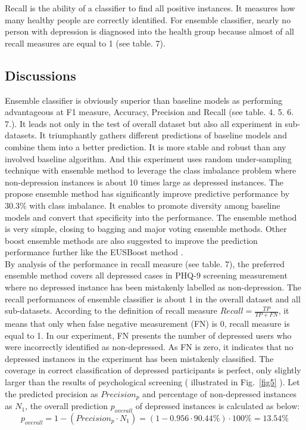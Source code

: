 \documentclass[12pt]{article}
\begin{document}
Recall is the ability of a classifier to find all positive instances. It measures how many healthy people are correctly identified. For ensemble classifier, nearly no person with depression is diagnosed into the health group because almost of all recall measures are equal to 1 (see table. 7).

\subsection{Discussions}
Ensemble classifier is obviously superior than baseline models as performing advantageous at F1 measure, Accuracy, Precision and Recall (see table. 4. 5. 6. 7.). It leads not only in the test of overall dataset but also all experiment in sub-datasets. It triumphantly gathers different predictions of baseline models and combine them into a better prediction. It is more stable and robust than any involved baseline algorithm. And this experiment uses random under-sampling technique with ensemble method to leverage the class imbalance problem where non-depression instances is about 10 times large as depressed instances. The propose ensemble method has significantly improve predictive performance by 30.3\% with class imbalance. It enables to promote diversity among baseline models and convert that specificity into the performance. The ensemble method is very simple, closing to bagging and major voting ensemble methods. Other boost ensemble methods are also suggested to improve the prediction performance further like the EUSBoost method \cite{Sagi}. \\

By analysis of the performance in recall measure (see table. 7), the preferred ensemble method covers all depressed cases in PHQ-9 screening measurement where no depressed instance has been mistakenly labelled as non-depression. The recall performances of ensemble classifier is about 1 in the overall dataset and all sub-datasets. According to the definition of recall measure  $ Recall = \frac{TP}{TP + FN} $, it means that only when false negative measurement (FN) is 0, recall measure is equal to 1. In our experiment, FN presents the number of depressed users who were incorrectly identified as non-depressed. As FN is zero, it indicates that no depressed instances in the experiment has been mistakenly classified. The coverage in correct classification of depressed participants is perfect, only slightly larger than the results of psychological screening ( illustrated in Fig.~\ref{fig5} ). Let the predicted precision as $Precision_{p}$ and percentage of non-depressed instances as $N_{1}$, the overall prediction $p_{overall}$ of depressed instances is calculated as below:\\
\begin{equation}\label{reio}
	p_{overall} = 1 - (Precision_{p} \cdot N_{1})= (1 -  0.956 \cdot 90.44\%) \cdot 100\% = 13.54\%
\end{equation}
\end{document}
